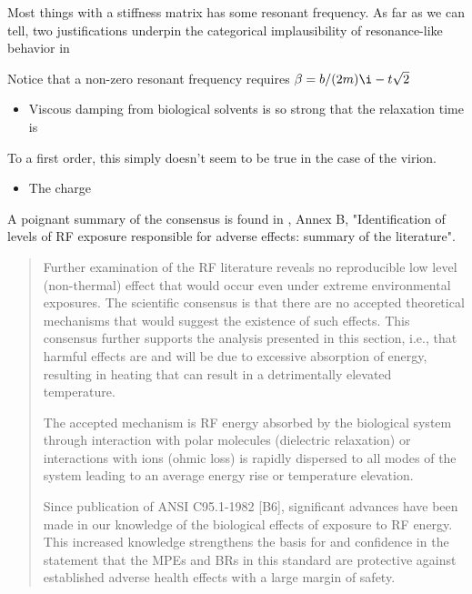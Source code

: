 \documentclass[paper.tex]{subfiles}
\begin{document}
\begin{multicols}{1}
Most things with a stiffness matrix has some resonant frequency\citationneeded. As far as we can tell, two justifications underpin the categorical implausibility of resonance-like behavior in 

Notice that a non-zero resonant frequency
requires $\beta = b/(2m) \i-t \sqrt{2}$ \cite{Driven}


\begin{itemize}
		\item Viscous damping from biological solvents is so strong that the relaxation time is 
\end{itemize}

To a first order, this simply doesn't seem to be true in the case of the virion.

\begin{itemize}
		\item The charge 
\end{itemize}








A poignant summary of the consensus is found in \cite{IEEE2006}, Annex B, "Identification of levels of RF exposure responsible for adverse effects: summary of the literature".

\begin{quote}
	Further examination of the RF literature reveals no reproducible low level (non-thermal) effect that would
	occur even under extreme environmental exposures. The scientific consensus is that there are no accepted
	theoretical mechanisms that would suggest the existence of such effects. This consensus further supports the
	analysis presented in this section, i.e., that harmful effects are and will be due to excessive absorption of
	energy, resulting in heating that can result in a detrimentally elevated temperature. 
	
	The accepted mechanism is RF energy absorbed by the biological system through interaction with polar molecules (dielectric relaxation) or interactions with ions (ohmic loss) is rapidly dispersed to all modes of the system leading to an average energy rise or temperature elevation. 
	
	Since publication of ANSI C95.1-1982 [B6], significant advances have been made in our knowledge of the biological effects of exposure to RF energy. This increased knowledge strengthens the basis for and confidence in the statement that the MPEs and BRs in this	standard are protective against established adverse health effects with a large margin of safety.
\end{quote}


\end{multicols}
\end{document}
